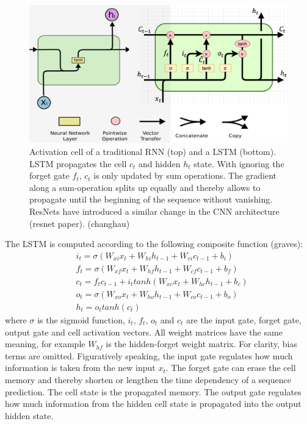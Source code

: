 \begin{figure}
	\centering
	\includegraphics [trim=0 0 0 0, clip, angle=0, width=1.0\columnwidth,
	keepaspectratio]{figures/rnn_lstm}
	\caption{Activation cell of a traditional RNN (top) and a LSTM (bottom). LSTM propagates the cell $c_t$ and hidden $h_t$ state. With ignoring the forget gate $f_t$, $c_t$ is only updated by sum operations. The gradient along a sum-operation splits up equally and thereby allows to propagate until the beginning of the sequence without vanishing. ResNets have introduced a similar change in the CNN architecture (resnet paper). (changhau)} 
	\label{fig:rnn_lstm} 
\end{figure}

The LSTM is computed according to the following composite function (graves):
\begin{equation}
\begin{aligned}
& i_t = \sigma(W_{xi}x_t + W_{hi}h_{t-1} + W_{ci}c_{t-1} + b_i)\\
& f_t = \sigma(W_{xf}x_t + W_{hf}h_{t-1} + W_{cf}c_{t-1} + b_f)\\
& c_t = f_tc_{t-1} + i_ttanh(W_{xc}x_t + W_{hc}h_{t-1} + b_c)\\
& o_t = \sigma(W_{xo}x_t + W_{ho}h_{t-1} + W_{co}c_{t-1} + b_o)\\
& h_t = o_ttanh(c_t)
\end{aligned}
\label{eq:lstm_eq} 
\end{equation}
where $\sigma$ is the sigmoid function, $i_t$, $f_t$, $o_t$ and $c_t$ are the input gate, forget gate, output gate and cell activation vectors. All weight matrices have the same meaning, for example $W_{hf}$ is the hidden-forget weight matrix. For clarity, bias terms are omitted. Figuratively speaking, the input gate regulates how much information is taken from the new input $x_t$. The forget gate can erase the cell memory and thereby shorten or lengthen the time dependency of a sequence prediction. The cell state is the propagated memory. The output gate regulates how much information from the hidden cell state is propagated into the output hidden state.

